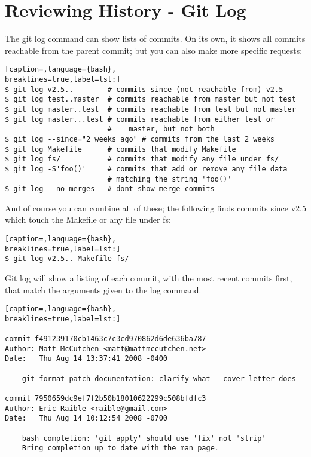 \section{Reviewing History - Git Log}
The git log command can show lists of commits. On its own, it shows all commits
reachable from the parent commit; but you can also make more specific requests:
\lstset{basicstyle=\scriptsize, numbers=none, captionpos=b, tabsize=4}
\begin{lstlisting}[caption=,language={bash},
breaklines=true,label=lst:]
$ git log v2.5..        # commits since (not reachable from) v2.5
$ git log test..master  # commits reachable from master but not test
$ git log master..test  # commits reachable from test but not master
$ git log master...test # commits reachable from either test or
                        #    master, but not both
$ git log --since="2 weeks ago" # commits from the last 2 weeks
$ git log Makefile      # commits that modify Makefile
$ git log fs/           # commits that modify any file under fs/
$ git log -S'foo()'     # commits that add or remove any file data
                        # matching the string 'foo()'
$ git log --no-merges   # dont show merge commits
\end{lstlisting}

And of course you can combine all of these; the following finds commits since
v2.5 which touch the Makefile or any file under fs:
\lstset{basicstyle=\scriptsize, numbers=none, captionpos=b, tabsize=4}
\begin{lstlisting}[caption=,language={bash},
breaklines=true,label=lst:]
$ git log v2.5.. Makefile fs/
\end{lstlisting}

Git log will show a listing of each commit, with the most recent commits first,
that match the arguments given to the log command.
\lstset{basicstyle=\scriptsize, numbers=none, captionpos=b, tabsize=4}
\begin{lstlisting}[caption=,language={bash},
breaklines=true,label=lst:]

commit f491239170cb1463c7c3cd970862d6de636ba787
Author: Matt McCutchen <matt@mattmccutchen.net>
Date:   Thu Aug 14 13:37:41 2008 -0400

    git format-patch documentation: clarify what --cover-letter does

commit 7950659dc9ef7f2b50b18010622299c508bfdfc3
Author: Eric Raible <raible@gmail.com>
Date:   Thu Aug 14 10:12:54 2008 -0700

    bash completion: 'git apply' should use 'fix' not 'strip'
    Bring completion up to date with the man page.
\end{lstlisting}

